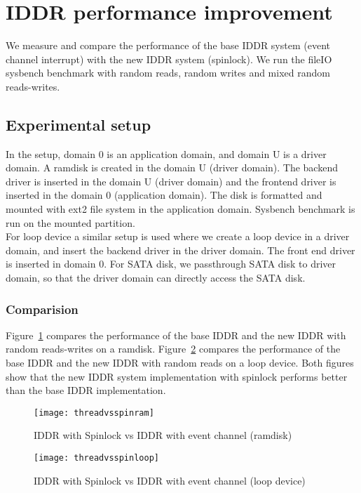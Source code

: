 \section{IDDR performance improvement}
We measure and compare the performance of the base IDDR system (event channel interrupt) with the new IDDR system (spinlock). We run the fileIO sysbench benchmark with random reads, random writes and mixed random reads-writes. 
\subsection{Experimental setup}
In the setup, domain 0 is an application domain, and domain U is a driver domain. A ramdisk is created in the domain U (driver domain). The backend driver is inserted in the domain U (driver domain) and the frontend driver is inserted in the domain 0 (application domain). The disk is formatted and mounted with ext2 file system in the application domain. Sysbench benchmark is run on the mounted partition. 
\\[3mm]
For loop device a similar setup is used where we create a loop device in a driver domain, and insert the backend driver in the driver domain. The front end driver is inserted in domain 0. For SATA disk, we passthrough SATA disk to driver domain, so that the driver domain can directly access the SATA disk. 
\subsubsection*{Comparision}
Figure~\ref{fig:threadvsspinram} compares the performance of the base IDDR and the new IDDR with random reads-writes on a ramdisk. Figure~\ref{fig:threadvsspinloop} compares the performance of the base IDDR and the new IDDR with random reads on a loop device. Both figures show that the new IDDR system implementation with spinlock performs better than the base IDDR implementation. 
\begin{figure}[!ht]
\centering
\texttt{[image: threadvsspinram]}
\caption{IDDR with Spinlock vs IDDR with event channel (ramdisk)}
\label{fig:threadvsspinram}
\end{figure}
\begin{figure}[!ht]
\centering
\texttt{[image: threadvsspinloop]}
\caption{IDDR with Spinlock vs IDDR with event channel (loop device)}
\label{fig:threadvsspinloop}
\end{figure}


